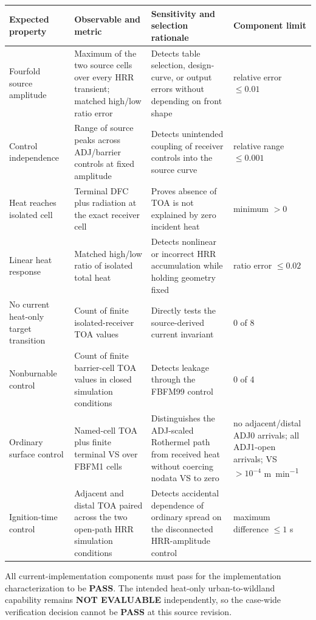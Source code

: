 \begin{center}
\setlength{\tabcolsep}{3pt}
\begin{longtable}{P{0.22\textwidth}P{0.24\textwidth}P{0.25\textwidth}P{0.18\textwidth}}
\toprule
Expected property & Observable and metric & Sensitivity and selection rationale & Component limit \\
\midrule
Fourfold source amplitude & Maximum of the two source cells over every HRR transient; matched high/low ratio error & Detects table selection, design-curve, or output errors without depending on front shape & relative error $\leq0.01$ \\
Control independence & Range of source peaks across ADJ/barrier controls at fixed amplitude & Detects unintended coupling of receiver controls into the source curve & relative range $\leq0.001$ \\
Heat reaches isolated cell & Terminal DFC plus radiation at the exact receiver cell & Proves absence of TOA is not explained by zero incident heat & minimum $>0$ \\
Linear heat response & Matched high/low ratio of isolated total heat & Detects nonlinear or incorrect HRR accumulation while holding geometry fixed & ratio error $\leq0.02$ \\
No current heat-only target transition & Count of finite isolated-receiver TOA values & Directly tests the source-derived current invariant & 0 of 8 \\
Nonburnable control & Count of finite barrier-cell TOA values in closed simulation conditions & Detects leakage through the FBFM99 control & 0 of 4 \\
Ordinary surface control & Named-cell TOA plus finite terminal VS over FBFM1 cells & Distinguishes the ADJ-scaled Rothermel path from received heat without coercing nodata VS to zero & no adjacent/distal ADJ0 arrivals; all ADJ1-open arrivals; VS $>10^{-4}$ \si{m.min^{-1}} \\
Ignition-time control & Adjacent and distal TOA paired across the two open-path HRR simulation conditions & Detects accidental dependence of ordinary spread on the disconnected HRR-amplitude control & maximum difference $\leq1$ s \\
\bottomrule
\end{longtable}
\end{center}

All current-implementation components must pass for the implementation
characterization to be \textbf{PASS}.  The intended heat-only urban-to-wildland
capability remains \textbf{NOT EVALUABLE} independently, so the case-wide
verification decision cannot be \textbf{PASS} at this source revision.

